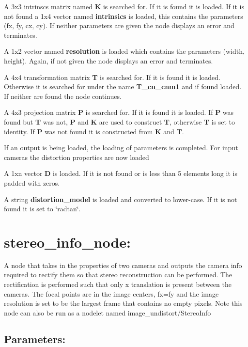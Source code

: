 \begin{DoxyEnumerate}
\item A 3x3 intrinscs matrix named {\bfseries K} is searched for. If it is found it is loaded. If it is not found a 1x4 vector named {\bfseries intrinsics} is loaded, this contains the parameters (fx, fy, cx, cy). If neither parameters are given the node displays an error and terminates.
\item A 1x2 vector named {\bfseries resolution} is loaded which contains the parameters (width, height). Again, if not given the node displays an error and terminates.
\item A 4x4 transformation matrix {\bfseries T} is searched for. If it is found it is loaded. Otherwise it is searched for under the name {\bfseries T\+\_\+cn\+\_\+cnm1} and if found loaded. If neither are found the node continues.
\item A 4x3 projection matrix {\bfseries P} is searched for. If it is found it is loaded. If {\bfseries P} was found but {\bfseries T} was not, {\bfseries P} and {\bfseries K} are used to construct {\bfseries T}, otherwise {\bfseries T} is set to identity. If {\bfseries P} was not found it is constructed from {\bfseries K} and {\bfseries T}.
\item If an output is being loaded, the loading of parameters is completed. For input cameras the distortion properties are now loaded
\item A 1xn vector {\bfseries D} is loaded. If it is not found or is less than 5 elements long it is padded with zeros.
\item A string {\bfseries distortion\+\_\+model} is loaded and converted to lower-\/case. If it is not found it is set to \char`\"{}radtan\char`\"{}.
\end{DoxyEnumerate}\hypertarget{md_vision_layer_image_undistort_README_autotoc_md100}{}\section{stereo\+\_\+info\+\_\+node\+:}\label{md_vision_layer_image_undistort_README_autotoc_md100}
A node that takes in the properties of two cameras and outputs the camera info required to rectify them so that stereo reconstruction can be performed. The rectification is performed such that only x translation is present between the cameras. The focal points are in the image centers, fx=fy and the image resolution is set to be the largest frame that contains no empty pixels. Note this node can also be run as a nodelet named image\+\_\+undistort/\+Stereo\+Info\hypertarget{md_vision_layer_image_undistort_README_autotoc_md101}{}\subsection{Parameters\+:}\label{md_vision_layer_image_undistort_README_autotoc_md101}

